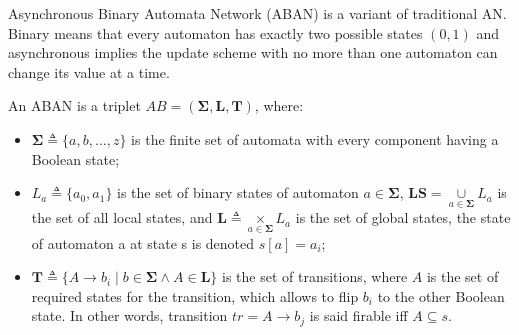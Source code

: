 \documentclass[runningheads]{llncs}
\newcommand{\acm}[3]{#1\rightarrow#2}
\begin{document}
%

Asynchronous Binary Automata Network (ABAN) is a variant of traditional AN.
Binary means that every automaton has exactly two possible states $(0,1)$ and asynchronous implies the update scheme with no more than one automaton can change its value at a time. 

\begin{definition}[ABAN]
An ABAN is a triplet $AB = (\mathbf{\Sigma},\mathbf{L},\mathbf{T})$, where:
\begin{itemize}
\item $\mathbf{\Sigma}\triangleq\{a,b,\ldots,z\}$ is the finite set of automata with every component having a Boolean state;
\item $L_a\triangleq\{a_0,a_1\}$ is the set of binary states of automaton $a\in \mathbf{\Sigma}$, $\mathbf{LS}=\underset{a\in \mathbf{\Sigma}}{\cup} L_a$ is the set of all local states, and $\mathbf{L}\triangleq \underset{a\in \mathbf{\Sigma}}{\times} L_a$ is the set of global states, the state of automaton a at state s is denoted $s[a]=a_i$;
\item $\mathbf{T}\triangleq \{A\rightarrow b_i\mid b\in \mathbf{\Sigma} \land A\in \mathbf{L}\}$ is the set of transitions, where $A$ is the set of required states for the transition, which allows to flip $b_i$ to the other Boolean state. In other words, transition $tr=\acm{A}{b_j}{b_k}$ is said firable iff $A\subseteq s$.
\end{itemize}
\end{definition}
\end{document}
